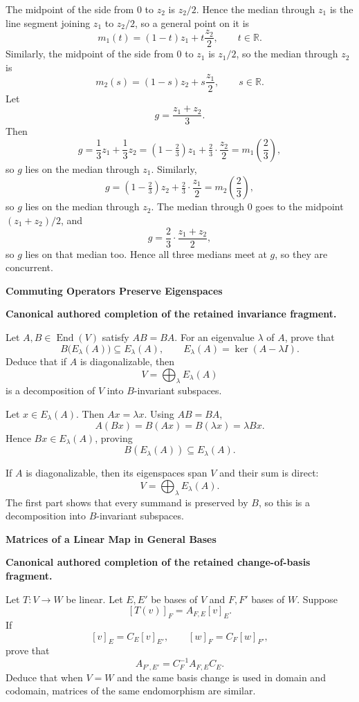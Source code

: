 \begin{solution}
The midpoint of the side from \(0\) to \(z_2\) is \(z_2/2\). Hence the median through \(z_1\) is the line segment joining
\(z_1\) to \(z_2/2\), so a general point on it is
\[
m_1(t)=(1-t)z_1+t\frac{z_2}{2},\qquad t\in\mathbb{R}.
\]
Similarly, the midpoint of the side from \(0\) to \(z_1\) is \(z_1/2\), so the median through \(z_2\) is
\[
m_2(s)=(1-s)z_2+s\frac{z_1}{2},\qquad s\in\mathbb{R}.
\]
Let
\[
g=\frac{z_1+z_2}{3}.
\]
Then
\[
g=\frac13 z_1+\frac13 z_2=(1-\tfrac23)z_1+\tfrac23\cdot\frac{z_2}{2}=m_1\!\left(\frac23\right),
\]
so \(g\) lies on the median through \(z_1\). Similarly,
\[
g=(1-\tfrac23)z_2+\tfrac23\cdot\frac{z_1}{2}=m_2\!\left(\frac23\right),
\]
so \(g\) lies on the median through \(z_2\). The median through \(0\) goes to the midpoint \((z_1+z_2)/2\), and
\[
g=\frac{2}{3}\cdot \frac{z_1+z_2}{2},
\]
so \(g\) lies on that median too. Hence all three medians meet at \(g\), so they are concurrent.
\end{solution}

\begin{problem}[CP-I-0076]
\label{prob:cp-i-0076}
\textbf{Commuting Operators Preserve Eigenspaces}

\textbf{Canonical authored completion of the retained invariance fragment.}

\hspace*{1.5em}Let \(A,B\in\operatorname{End}(V)\) satisfy \(AB=BA\).
For an eigenvalue \(\lambda\) of \(A\), prove that
\[
B\bigl(E_\lambda(A)\bigr)\subseteq E_\lambda(A),
\qquad
E_\lambda(A)=\ker(A-\lambda I).
\]
Deduce that if \(A\) is diagonalizable, then
\[
V=\bigoplus_{\lambda}E_\lambda(A)
\]
is a decomposition of \(V\) into \(B\)-invariant subspaces.
\end{problem}

\begin{solution}
Let \(x\in E_\lambda(A)\). Then \(Ax=\lambda x\). Using \(AB=BA\),
\[
A(Bx)=B(Ax)=B(\lambda x)=\lambda Bx.
\]
Hence \(Bx\in E_\lambda(A)\), proving
\[
B(E_\lambda(A))\subseteq E_\lambda(A).
\]

If \(A\) is diagonalizable, then its eigenspaces span \(V\) and their sum is direct:
\[
V=\bigoplus_{\lambda}E_\lambda(A).
\]
The first part shows that every summand is preserved by \(B\), so this is a decomposition into
\(B\)-invariant subspaces.
\end{solution}

\begin{problem}[CP-I-0083]
\label{prob:cp-i-0083}
\textbf{Matrices of a Linear Map in General Bases}

\textbf{Canonical authored completion of the retained change-of-basis fragment.}

\hspace*{1.5em}Let \(T:V\to W\) be linear. Let \(E,E'\) be bases of \(V\) and \(F,F'\)
bases of \(W\). Suppose
\[
[T(v)]_F=A_{F,E}[v]_E.
\]
If
\[
[v]_E=C_E[v]_{E'},\qquad [w]_F=C_F[w]_{F'},
\]
prove that
\[
A_{F',E'}=C_F^{-1}A_{F,E}C_E.
\]
Deduce that when \(V=W\) and the same basis change is used in domain and codomain, matrices
of the same endomorphism are similar.
\end{problem}

